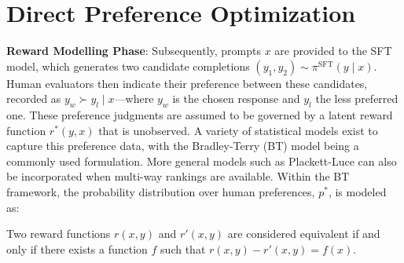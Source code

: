 \section{Direct Preference Optimization}\label{sec:DPO}

\textbf{Reward Modelling Phase}: Subsequently, prompts $x$ are provided to the SFT model, which generates two candidate completions $(y_1, y_2)\sim \pi^\text{SFT}(y \mid x)$. Human evaluators then indicate their preference between these candidates, recorded as $y_w\succ y_l \mid x$—where $y_w$ is the chosen response and $y_l$ the less preferred one. These preference judgments are assumed to be governed by a latent reward function $r^*(y, x)$ that is unobserved. A variety of statistical models exist to capture this preference data, with the Bradley-Terry (BT) model \cite{bradley1952rankanalysis} being a commonly used formulation. More general models such as Plackett-Luce \citep{plackett1975analysis, luce2012individual} can also be incorporated when multi-way rankings are available. Within the BT framework, the probability distribution over human preferences, $p^*$, is modeled as:

\begin{definition}
Two reward functions $r(x, y)$ and $r'(x, y)$ are considered equivalent if and only if there exists a function $f$ such that ${r(x, y) - r'(x, y) = f(x)}$.
\end{definition}

